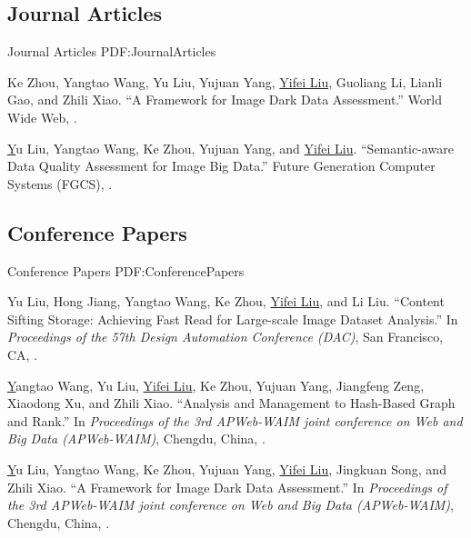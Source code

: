 \documentclass[letterpaper,10pt,oneside]{article}
\begin{document}
\begin{body}
\subsection
{Journal Articles}
{Journal Articles}
{PDF:JournalArticles}
\GapNoBreak

\NumberedItem{[1]}
Ke Zhou, Yangtao Wang, Yu Liu, Yujuan Yang, \underline{Yifei Liu}, Guoliang Li, Lianli Gao, and Zhili Xiao.
``A Framework for Image Dark Data Assessment.'' 
World Wide Web,
.

\BigGap
\NumberedItem{[2]}
\href{https://www.sciencedirect.com/science/article/pii/S0167739X19302304}
Yu Liu, Yangtao Wang, Ke Zhou, Yujuan Yang, and \underline{Yifei Liu}.
``Semantic-aware Data Quality Assessment for Image Big Data.'' 
Future Generation Computer Systems (FGCS),
.
\BigGap
\GapNoBreak

\subsection
{Conference Papers}
{Conference Papers}
{PDF:ConferencePapers}
\GapNoBreak

\NumberedItem{[1]}
Yu Liu, Hong Jiang, Yangtao Wang, Ke Zhou, \underline{Yifei Liu}, and Li Liu.
``Content Sifting Storage: Achieving Fast Read for Large-scale Image Dataset Analysis.''
In \textit{Proceedings of the 57th Design Automation Conference (DAC)}, San Francisco, CA,
.

\BigGap
\NumberedItem{[2]}
\href{https://link.springer.com/chapter/10.1007/978-3-030-26072-9_22}
Yangtao Wang, Yu Liu, \underline{Yifei Liu}, Ke Zhou, Yujuan Yang, Jiangfeng Zeng, Xiaodong Xu, and Zhili Xiao.
``Analysis and Management to Hash-Based Graph and Rank.''
In \textit{Proceedings of the 3rd APWeb-WAIM joint conference on Web and Big Data (APWeb-WAIM)}, Chengdu, China,
.

\BigGap
\NumberedItem{[3]}
\href{https://link.springer.com/chapter/10.1007/978-3-030-26072-9_1}
Yu Liu, Yangtao Wang, Ke Zhou, Yujuan Yang, \underline{Yifei Liu}, Jingkuan Song, and Zhili Xiao.
``A Framework for Image Dark Data Assessment.''
In \textit{Proceedings of the 3rd APWeb-WAIM joint conference on Web and Big Data (APWeb-WAIM)}, Chengdu, China,
.


\end{body}
\end{document}
